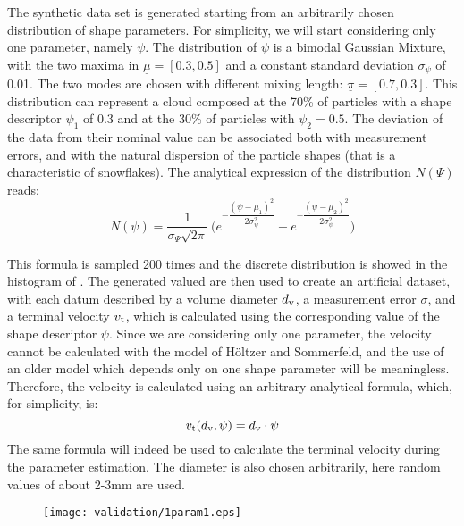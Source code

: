 		The synthetic data set is generated starting from an arbitrarily chosen distribution of shape parameters. For simplicity, we will start considering only one parameter, namely $ \psi $. The distribution of $ \psi $ is a bimodal Gaussian Mixture, with the two maxima in $ \underline{\mu} = [0.3, 0.5] $ and a constant standard deviation $ \sigma_{\psi} $ of 0.01. The two modes are chosen with different mixing length: $ \underline{\pi} = [0.7, 0.3] $.
		This distribution can represent a cloud composed at the 70\% of particles with a shape descriptor $ \psi_1 $ of 0.3 and at the 30\% of particles with $ \psi_2 = 0.5 $. The deviation of the data from their nominal value can be associated both with measurement errors, and with the natural dispersion of the particle shapes (that is a characteristic of snowflakes).
		The analytical expression of the distribution $ N(\Psi) $ reads:
		\begin{equation}
			N(\psi) = \dfrac{1}{\sigma_{\Psi} \sqrt{2 \pi}} \ \bigg(
			          e^{-\dfrac{(\psi - \mu_1)^2}{2 \sigma_{\psi}^2}}
			        + e^{-\dfrac{(\psi - \mu_2)^2}{2 \sigma_{\psi}^2}} \bigg) 
		\end{equation}
		
		This formula is sampled 200 times and the discrete distribution is showed in the histogram of . The generated valued are then used to create an artificial dataset, with each datum described by a volume diameter $ d_{\textup{v}} $, a measurement error $ \sigma $, and a terminal velocity $ v_{\textup{t}} $, which is calculated using the corresponding value of the shape descriptor $ \psi $. Since we are considering only one parameter, the velocity cannot be calculated with the model of H\"oltzer and Sommerfeld, and the use of an older model which depends only on one shape parameter will be meaningless. Therefore, the velocity is calculated using an arbitrary analytical formula, which, for simplicity, is:
		\begin{equation}
			v_{\textup{t}}(d_{\textup{v}}, \psi) = d_{\textup{v}} \cdot \psi
		\end{equation}
		The same formula will indeed be used to calculate the terminal velocity during the parameter estimation.
		The diameter is also chosen arbitrarily, here random values of about 2-3mm are used.	
		\begin{figure}
			\centering
			\texttt{[image: validation/1param1.eps]}
			\caption{}
			\label{val: 1param1}
		\end{figure}
		
